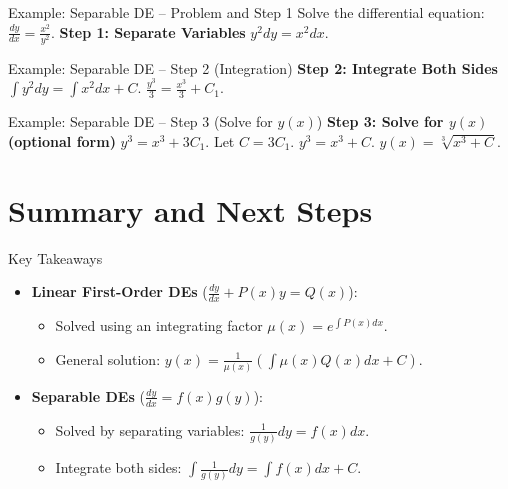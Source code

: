\documentclass[10pt,aspectratio=169]{beamer}
\begin{document}
\begin{frame}{Example: Separable DE -- Problem and Step 1}
    Solve the differential equation: $\frac{dy}{dx} = \frac{x^2}{y^2}$.
    \vspace{1em}
    \textbf{Step 1: Separate Variables}
    $y^2 dy = x^2 dx$.
\end{frame}

\begin{frame}{Example: Separable DE -- Step 2 (Integration)}
    \textbf{Step 2: Integrate Both Sides}
    $\int y^2 dy = \int x^2 dx + C$.
    $\frac{y^3}{3} = \frac{x^3}{3} + C_1$.
\end{frame}

\begin{frame}{Example: Separable DE -- Step 3 (Solve for $y(x)$)}
    \textbf{Step 3: Solve for $y(x)$ (optional form)}
    $y^3 = x^3 + 3C_1$. Let $C = 3C_1$.
    $y^3 = x^3 + C$.
    $y(x) = \sqrt[3]{x^3 + C}$.
\end{frame}

\section{Summary and Next Steps}

\begin{frame}{Key Takeaways}
    \begin{itemize}
        \item \textbf{Linear First-Order DEs} ($\frac{dy}{dx} + P(x)y = Q(x)$):
        \begin{itemize}
            \item Solved using an integrating factor $\mu(x) = e^{\int P(x)dx}$.
            \item General solution: $y(x) = \frac{1}{\mu(x)} \left( \int \mu(x)Q(x)dx + C \right)$.
        \end{itemize}
        \item \textbf{Separable DEs} ($\frac{dy}{dx} = f(x)g(y)$):
        \begin{itemize}
            \item Solved by separating variables: $\frac{1}{g(y)}dy = f(x)dx$.
            \item Integrate both sides: $\int \frac{1}{g(y)}dy = \int f(x)dx + C$.
        \end{itemize}
    \end{itemize}
\end{frame}
\end{document}
